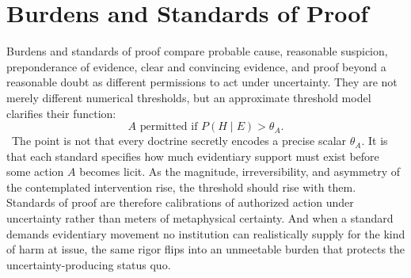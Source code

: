 
\chapter{Burdens and Standards of Proof}
\label{ch:ch036}

Burdens and standards of proof compare probable cause, reasonable suspicion, preponderance of evidence, clear and convincing evidence, and proof beyond a reasonable doubt as different permissions to act under uncertainty. They are not merely different numerical thresholds, but an approximate threshold model clarifies their function:
\[
A\text{ permitted if }P(H\mid E)>\theta_A.
\]
\ToyModel\ The point is not that every doctrine secretly encodes a precise scalar \(\theta_A\).
It is that each standard specifies how much evidentiary support must exist before some action \(A\) becomes licit. As the magnitude, irreversibility, and asymmetry of the contemplated intervention rise, the threshold should rise with them. Standards of proof are therefore calibrations of authorized action under uncertainty rather than meters of metaphysical certainty. And when a standard demands evidentiary movement no institution can realistically supply for the kind of harm at issue, the same rigor flips into an unmeetable burden that protects the uncertainty-producing status quo.
